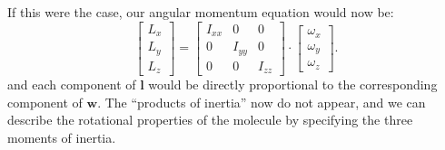 \documentclass[a4paper]{article}
\newcommand{\bvec}[1]{\boldsymbol{\mathbf{#1}}}
\begin{document}
If this were the case, our angular momentum equation would now be:
\begin{equation*}
\begin{bmatrix}L_x\\L_y\\L_z\end{bmatrix} = 
\begin{bmatrix} 
I_{xx} & 0 & 0 \\
0 & I_{yy} & 0 \\
0 & 0 & I_{zz} 
\end{bmatrix}
\cdot
\begin{bmatrix}\omega_x\\\omega_y\\\omega_z\end{bmatrix}.
\end{equation*} 
and each component of $\bvec{l}$ would be directly proportional to the corresponding component of $\bvec{w}$. The ``products of inertia'' now do not appear, and we can describe the rotational properties of the molecule by specifying the three moments of inertia.
\end{document}
